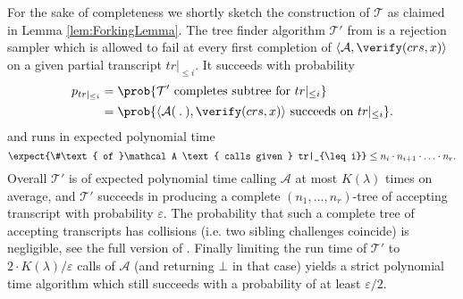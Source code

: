 \documentclass[10pt,article,oneside]{memoir}
\newtheorem{lem}[]{Lemma}
\theoremstyle{definition}
\theoremstyle{remark}
\DeclareMathOperator{\setup}{\mathsf{Setup}}
\DeclareMathOperator{\prove}{\mathsf{Prove}}
\begin{document}



For the sake of completeness we shortly sketch the construction of $\mathcal T$ as claimed in Lemma \ref{lem:ForkingLemma}.
The tree finder algorithm $\mathcal T'$ from \cite{BootleGroth} is a rejection sampler which is allowed to fail at every first completion of $\langle\mathcal A,\verify(crs,x)\rangle$ on a given partial transcript $tr|_{\leq i}$.
It succeeds with probability 
\begin{align*}
p_{tr|_{\leq i}} &= \prob{ \mathcal T' ~\text{completes subtree for } tr|_{\leq i}} 
\\
&= \prob{\langle\mathcal A(\:.\:),\verify(crs, x)\rangle ~\text{succeeds on } tr|_{\leq i} }.
\end{align*}
and runs in expected polynomial time
\[
\expect{\#\text{ of }\mathcal A \text{ calls given } tr|_{\leq i}}  \leq n_i\cdot n_{i+1}\cdot\ldots\cdot n_r.
\]
Overall $\mathcal T'$ is of expected polynomial time calling  $\mathcal A$ at most $K(\lambda)$ times on average, and $\mathcal T'$ succeeds in producing a complete $(n_1,...,n_r)$-tree of accepting transcript with probability $\varepsilon$. 
The probability that such a complete tree of accepting transcripts has collisions (i.e. two sibling challenges coincide) is negligible, see the full version of \cite{BootleGroth}.
Finally limiting the run time of $\mathcal T'$ to $2\cdot K(\lambda)/\varepsilon$ calls of $\mathcal A$ (and returning $\bot$ in that case) yields a strict polynomial time algorithm  which still succeeds with a probability of at least $\varepsilon/2$.
\end{document}
